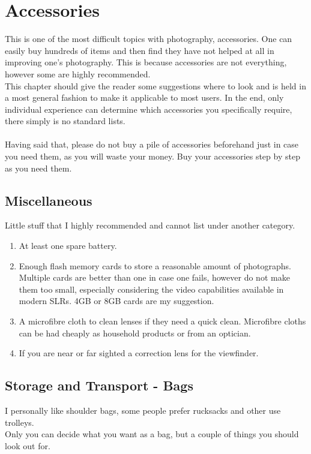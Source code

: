 \chapter{Accessories}

This is one of the most difficult topics with photography, accessories. One can easily buy hundreds of items and then find they have not helped at all in improving one's photography. This is because accessories are not everything, however some are highly recommended.
\\
This chapter should give the reader some suggestions where to look and is held in a most general fashion to make it applicable to most users. In the end, only individual experience can determine which accessories you specifically require, there simply is no standard lists.
\\
\\
Having said that, please do not buy a pile of accessories beforehand just in case you need them, as you will waste your money. Buy your accessories step by step as you need them.

\section{Miscellaneous}

Little stuff that I highly recommended and cannot list under another category.
\begin{enumerate}[i]
	\item At least one spare battery.
	\item Enough flash memory cards to store a reasonable amount of photographs. Multiple cards are better than one in case one fails, however do not make them too small, especially considering the video capabilities available in modern SLRs. 4GB or 8GB cards are my suggestion.
	\item A microfibre cloth to clean lenses if they need a quick clean. Microfibre cloths can be had cheaply as household products or from an optician.
	\item If you are near or far sighted a correction lens for the \gls{viewfinder}.
\end{enumerate}

\section{Storage and Transport - Bags}

I personally like shoulder bags, some people prefer rucksacks and other use trolleys.
\\
Only you can decide what you want as a bag, but a couple of things you should look out for.


